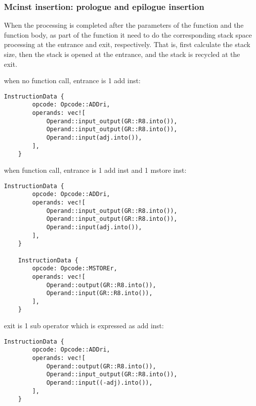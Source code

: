 \subsubsection{Mcinst insertion: prologue and epilogue insertion}

When the processing is completed after the parameters of the function and the function body, 
as part of the function it need to do the corresponding stack space processing at the entrance and exit, respectively. 
That is, first calculate the stack size, then the stack is opened at the entrance, and the stack is recycled at the exit.

when no function call, entrance is 1 add inst:
\begin{lstlisting}[language={}]
    InstructionData {
        opcode: Opcode::ADDri,
        operands: vec![
            Operand::input_output(GR::R8.into()),
            Operand::input_output(GR::R8.into()),
            Operand::input(adj.into()),
        ],
    }
\end{lstlisting}

when function call, entrance is  1 add inst and 1 mstore inst:
\begin{lstlisting}[language={}]
    InstructionData {
        opcode: Opcode::ADDri,
        operands: vec![
            Operand::input_output(GR::R8.into()),
            Operand::input_output(GR::R8.into()),
            Operand::input(adj.into()),
        ],
    }

    InstructionData {
        opcode: Opcode::MSTOREr,
        operands: vec![
            Operand::output(GR::R8.into()),
            Operand::input(GR::R8.into()),
        ],
    }
\end{lstlisting}

exit is 1 sub operator which is expressed as add inst:
\begin{lstlisting}[language={}]
    InstructionData {
        opcode: Opcode::ADDri,
        operands: vec![
            Operand::output(GR::R8.into()),
            Operand::input_output(GR::R8.into()),
            Operand::input((-adj).into()),
        ],
    }
\end{lstlisting}